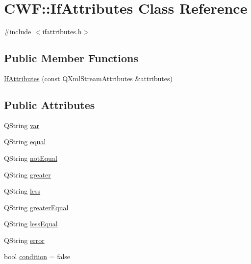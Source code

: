 \hypertarget{class_c_w_f_1_1_if_attributes}{\section{C\+W\+F\+:\+:If\+Attributes Class Reference}
\label{class_c_w_f_1_1_if_attributes}
}


{\ttfamily \#include $<$ifattributes.\+h$>$}

\subsection*{Public Member Functions}
\begin{DoxyCompactItemize}
\item 
\hyperlink{class_c_w_f_1_1_if_attributes_abbb26ca2878fade9ad1dc6cfb3f94ac1}{If\+Attributes} (const Q\+Xml\+Stream\+Attributes \&attributes)
\end{DoxyCompactItemize}
\subsection*{Public Attributes}
\begin{DoxyCompactItemize}
\item 
Q\+String \hyperlink{class_c_w_f_1_1_if_attributes_a57a2a9012c72fb354b2bf1e30f2bd832}{var}
\item 
Q\+String \hyperlink{class_c_w_f_1_1_if_attributes_a514ef0fbe32a7c2ea5aba6218f182477}{equal}
\item 
Q\+String \hyperlink{class_c_w_f_1_1_if_attributes_aebb39701f4b50e474998c95d099ac977}{not\+Equal}
\item 
Q\+String \hyperlink{class_c_w_f_1_1_if_attributes_a19ce01e769f9a51eb087e20b05f9e2f3}{greater}
\item 
Q\+String \hyperlink{class_c_w_f_1_1_if_attributes_a16843cddaa8d16acf67a31a1258826d5}{less}
\item 
Q\+String \hyperlink{class_c_w_f_1_1_if_attributes_aae911ff049668fedc849435c466891ac}{greater\+Equal}
\item 
Q\+String \hyperlink{class_c_w_f_1_1_if_attributes_aea6e443b32ec1deaf0d0f7025d49b9b2}{less\+Equal}
\item 
Q\+String \hyperlink{class_c_w_f_1_1_if_attributes_acde13fdcb70d1667f96b197762349d54}{error}
\item 
bool \hyperlink{class_c_w_f_1_1_if_attributes_a333a69fcd0b5c9cc450e5f1a9c0434cb}{condition} = false
\end{DoxyCompactItemize}


